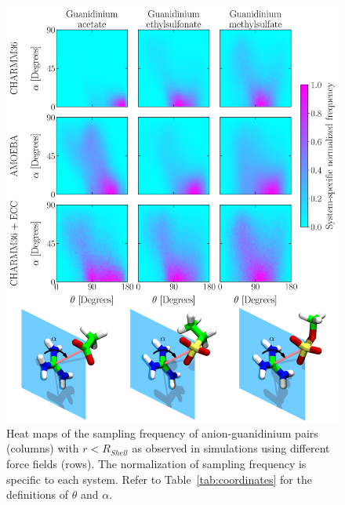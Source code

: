 \documentclass[journal=jacsat,articletitle=true,manuscript=suppinfo,layout=onecolumn]{achemso}
\begin{document}
    \begin{figure}[H]
    \begin{center}
        \includegraphics[width=\textwidth]{images/fig_hexmaps_guan.pdf}
        \caption{Heat maps of the sampling frequency of anion-guanidinium pairs (columns) with $r < R_{Shell}$ as observed in simulations using different force fields (rows). The normalization of sampling frequency is specific to each system. Refer to Table~\ref{tab:coordinates} for the definitions of $\theta$ and $\alpha$.}
        \label{fig:heatmap_guan}
    \end{center}
    \end{figure}
    
\end{document}
